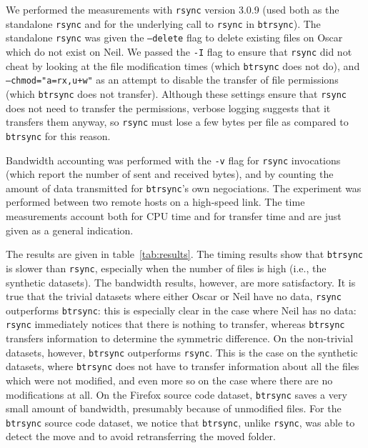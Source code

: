 \documentclass[11pt]{llncs}
\newcommand{\btrsync}{\texttt{btrsync}\xspace}
\newcommand{\rsync}{\texttt{rsync}\xspace}
\begin{document}
We performed the measurements with \rsync version 3.0.9 (used both
as the standalone \rsync and for the underlying call to \rsync in
\btrsync). The standalone \rsync was given the \texttt{--delete} flag to delete
existing files on Oscar which do not exist on Neil. We passed the \texttt{-I}
flag to ensure that \rsync did not cheat by looking at the file modification
times (which \btrsync does not do), and \texttt{--chmod="a=rx,u+w"} as an
attempt to disable the transfer of file permissions (which \btrsync does not
transfer). Although these settings ensure that \rsync does not need to transfer
the permissions, verbose logging suggests that it transfers them anyway, so
\rsync must lose a few bytes per file as compared to \btrsync for this reason.

Bandwidth accounting was performed with the \texttt{-v} flag for \rsync
invocations (which report the number of sent and received bytes), and by
counting the amount of data transmitted for \btrsync's own negociations. The
experiment was performed between two remote hosts on a high-speed link. The time
measurements account both for CPU time and for transfer time and are just given
as a general indication.

The results are given in table~\ref{tab:results}. The timing results show that
\btrsync is slower than \rsync, especially when the number of files is high
(i.e., the synthetic datasets). The bandwidth results, however, are more
satisfactory. It is true that the trivial datasets where either Oscar or Neil
have no data, \rsync outperforms \btrsync: this is especially clear in the case
where Neil has no data: \rsync immediately notices that there is nothing to
transfer, whereas \btrsync transfers information to determine the symmetric
difference. On the non-trivial datasets, however, \btrsync outperforms \rsync.
This is the case on the synthetic datasets, where \btrsync does not have to
transfer information about all the files which were not modified, and even more
so on the case where there are no modifications at all. On the Firefox source
code dataset, \btrsync saves a very small amount of bandwidth, presumably
because of unmodified files. For the \btrsync source code dataset, we notice
that \btrsync, unlike \rsync, was able to detect the move and to avoid
retransferring the moved folder.
\end{document}
